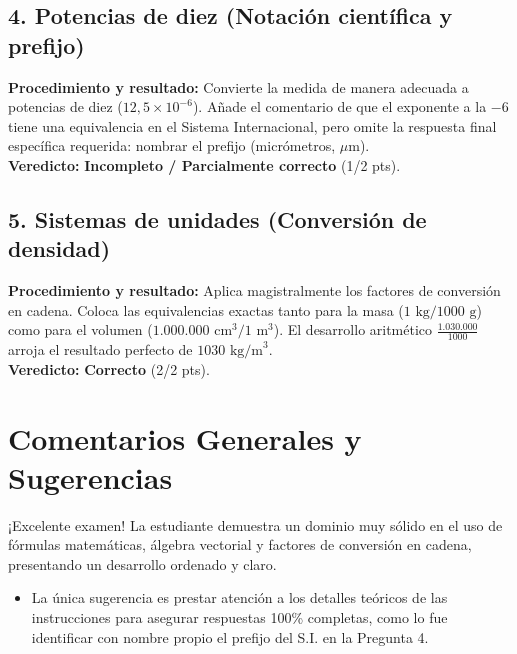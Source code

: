 \documentclass[12pt]{article}
\begin{document}
\subsection*{4. Potencias de diez (Notación científica y prefijo)}
\textbf{Procedimiento y resultado:} Convierte la medida de manera adecuada a potencias de diez ($12,5 \times 10^{-6}$). Añade el comentario de que el exponente a la $-6$ tiene una equivalencia en el Sistema Internacional, pero omite la respuesta final específica requerida: nombrar el prefijo (micrómetros, $\mu$m). \\
\textbf{Veredicto:} \textbf{Incompleto / Parcialmente correcto} (1/2 pts).

\subsection*{5. Sistemas de unidades (Conversión de densidad)}
\textbf{Procedimiento y resultado:} Aplica magistralmente los factores de conversión en cadena. Coloca las equivalencias exactas tanto para la masa ($1\text{ kg} / 1000\text{ g}$) como para el volumen ($1.000.000\text{ cm}^3 / 1\text{ m}^3$). El desarrollo aritmético $\frac{1.030.000}{1000}$ arroja el resultado perfecto de $1030 \text{ kg/m}^3$. \\
\textbf{Veredicto:} \textbf{Correcto} (2/2 pts).

\vspace{0.5cm}
\section*{Comentarios Generales y Sugerencias}
¡Excelente examen! La estudiante demuestra un dominio muy sólido en el uso de fórmulas matemáticas, álgebra vectorial y factores de conversión en cadena, presentando un desarrollo ordenado y claro.
\begin{itemize}
    \item La única sugerencia es prestar atención a los detalles teóricos de las instrucciones para asegurar respuestas 100\% completas, como lo fue identificar con nombre propio el prefijo del S.I. en la Pregunta 4.
\end{itemize}
\end{document}
